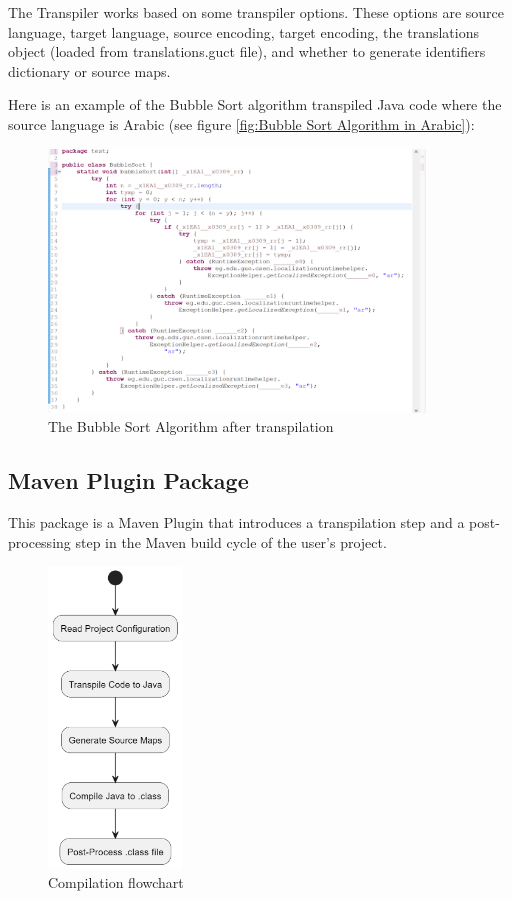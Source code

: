 The Transpiler works based on some transpiler options. These options are source language, target language, source encoding, target encoding, the translations object (loaded from translations.guct file), and whether to generate identifiers dictionary or source maps.

Here is an example of the Bubble Sort algorithm transpiled Java code where the source language is Arabic (see figure \ref{fig:Bubble Sort Algorithm in Arabic}):

\begin{figure}[H]
\centering
\includegraphics[width=10cm]{ch3-images/bubblesort_transpiled.png}
\caption{The Bubble Sort Algorithm after transpilation}
\label{fig:The Bubble Sort Algorithm after transpilation}
\end{figure} 

\subsection{Maven Plugin Package}
This package is a Maven Plugin that introduces a transpilation step and a post-processing step in the Maven build cycle of the user's project.

\begin{figure}[H]
\centering
\includegraphics[height=8cm]{ch3-images/compilation.png}
\caption{Compilation flowchart}
\label{fig:Compilation flowchart}
\end{figure} 

